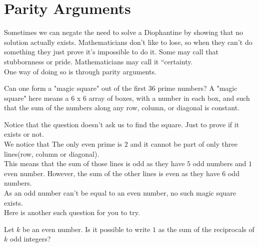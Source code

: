 \section{Parity Arguments}
Sometimes we can negate the need to solve a Diophantine by showing that no solution actually exists. Mathematicians don't like to lose, so when they can't do something they just prove it's impossible to do it. Some may call that stubbornness or pride. Mathematicians may call it “certainty.\\
One way of doing so is through parity arguments.
\begin{example}
    Can one form a "magic square" out of the first 36 prime numbers? A "magic square" here means a 6 x 6 array of boxes, with a number in each box, and such that the sum of the numbers along any row, column, or diagonal is constant. 
\end{example}
Notice that the question doesn't ask us to find the square. Just to prove if it exists or not.\\
We notice that The only even prime is $2$ and it cannot be part of only three lines(row, column or diagonal).\\
This means that the sum of those lines is odd as they have $5$ odd numbers and $1$ even number. However, the sum of the other lines is even as they have $6$ odd numbers.\\
As an odd number can't be equal to an even number, no such magic square exists.\\
Here is another such question for you to try.
\begin{example}
Let $k$ be an even number. Is it possible to write $1$ as the sum of the reciprocals of $k$ odd integers?
\end{example}
